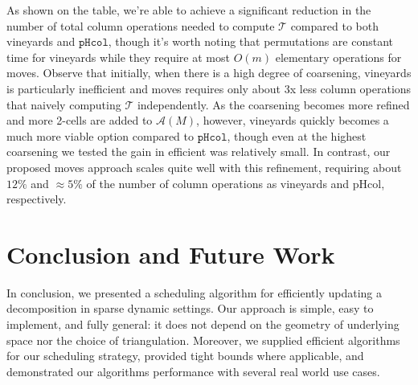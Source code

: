 \documentclass{siamart190516}
\begin{document}
\noindent
As shown on the table, we're able to achieve a significant reduction in the number of total column operations needed to compute $\mathcal{T}$ compared to both vineyards and $\mathtt{pHcol}$, though it's worth noting that permutations are constant time for vineyards while they require at most $O(m)$ elementary operations for moves. Observe that initially, when there is a high degree of coarsening, vineyards is particularly inefficient and moves requires only about 3x less column operations that naively computing $\mathcal{T}$ independently. As the coarsening becomes more refined and more 2-cells are added to $\mathcal{A}(M)$, however, vineyards quickly becomes a much more viable option compared to $\mathtt{pHcol}$, though even at the highest coarsening we tested the gain in efficient was relatively small. In contrast, our proposed moves approach scales quite well with this refinement, requiring about $12\%$  and $\approx 5\%$ of the number of column operations as vineyards and $\mathrm{pHcol}$, respectively. 






\section{Conclusion and Future Work}\label{sec:conclusion}
In conclusion, we presented a scheduling algorithm for efficiently updating a decomposition in sparse dynamic settings. Our approach is simple, easy to implement, and fully general: it does not depend on the geometry of underlying space nor the choice of triangulation. Moreover, we supplied efficient algorithms for our scheduling strategy, provided tight bounds where applicable, and demonstrated our algorithms performance with several real world use cases.
\end{document}
